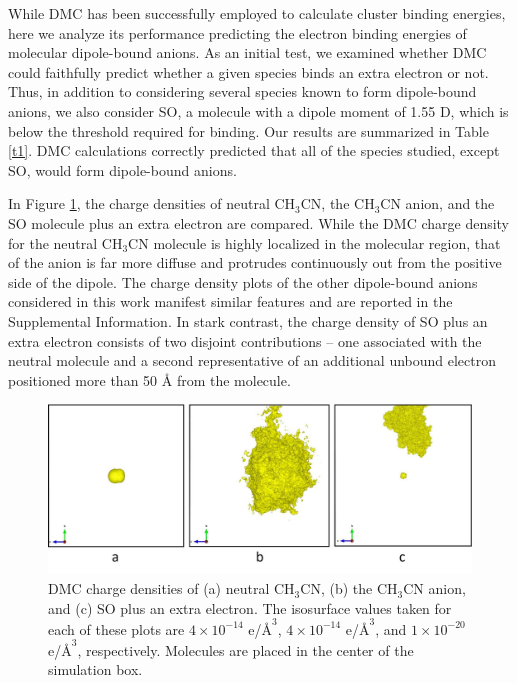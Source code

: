 While DMC has been successfully employed to calculate cluster binding energies,\cite{10.1021/jp9066108,10.1021/jp404541c} here we analyze its performance predicting the electron binding energies of molecular dipole-bound anions. As an initial test, we examined whether DMC could faithfully predict whether a given species binds an extra electron or not. Thus, in addition to considering several species known to form dipole-bound anions, we also consider SO, a molecule with a dipole moment of 1.55 D, which is below the threshold required for binding. Our results are summarized in Table \ref{t1}. DMC calculations correctly predicted that all of the species studied, except SO, would form dipole-bound anions. 

In Figure \ref{f1}, the charge densities of neutral CH$_{3}$CN, the CH$_{3}$CN anion, and the SO molecule plus an extra electron are compared. While the DMC charge density for the neutral CH$_{3}$CN molecule is highly localized in the molecular region, that of the anion is far more diffuse and protrudes continuously out from the positive side of the dipole. The charge density plots of the other dipole-bound anions considered in this work manifest similar features and are reported in the Supplemental Information. In stark contrast, the charge density of SO plus an extra electron consists of two disjoint contributions -- one associated with the neutral molecule and a second representative of an additional unbound electron positioned more than 50 $\mbox{\AA}$ from the molecule. 
\begin{center}
\begin{figure}[htbp]
\includegraphics[width=\textwidth]{Images/chapter2/Neutral-anion-SO.pdf}
\caption{DMC charge densities of (a) neutral CH$_3$CN, (b) the CH$_3$CN anion, and (c) SO plus an extra electron. The isosurface values taken for each of these plots are $4 \times 10^{-14}$ e/$\mbox{\AA}^3$, $4\times 10^{-14}$ e/$\mbox{\AA}^3$, and $1 \times 10^{-20}$ e/$\mbox{\AA}^3$, respectively. Molecules are placed in the center of the simulation box.}
\label{f1}
\end{figure}
\end{center}

